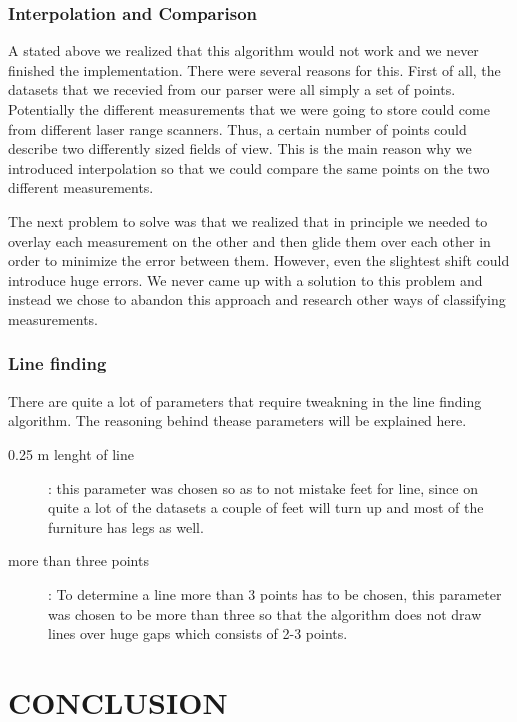 \documentclass[a4paper, 10pt, conference]{ieeeconf}      %
\begin{document}
\subsubsection{Interpolation and Comparison}
A stated above we realized that this algorithm would not work and we never finished the implementation. There were several reasons for this. First of all, the datasets that we recevied from our parser were all simply a set of points. Potentially the different measurements that we were going to store could come from different laser range scanners. Thus, a certain number of points could describe two differently sized fields of view. This is the main reason why we introduced interpolation so that we could compare the same points on the two different measurements.

The next problem to solve was that we realized that in principle we needed to overlay each measurement on the other and then glide them over each other in order to minimize the error between them. However, even the slightest shift could introduce huge errors. We never came up with a solution to this problem and instead we chose to abandon this approach and research other ways of classifying measurements.

\subsubsection{Line finding}
There are quite a lot of parameters that require tweakning in the line finding algorithm. The reasoning behind thease parameters will be explained here.

\begin{description}
\item[0.25 m lenght of line]: this parameter was chosen so as to not mistake feet for line, since on quite a lot of the datasets a couple of feet will turn up and most of the furniture has legs as well.
\item[more than three points]: To determine a line more than 3 points has to be chosen, this parameter was chosen to be more than three so that the algorithm does not draw lines over huge gaps which consists of 2-3 points.
\end{description}
 
\section{CONCLUSION}




\end{document}

